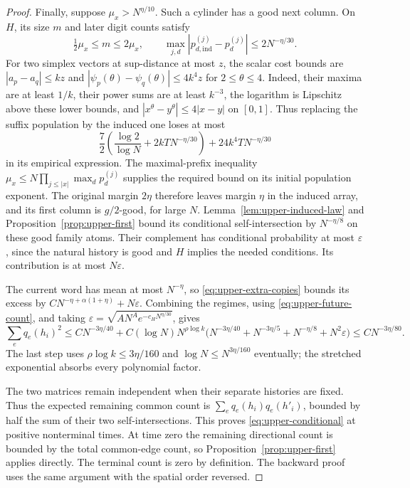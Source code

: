 \begin{proof}
Finally, suppose $\mu_x>N^{\eta/10}$. Such a cylinder has a good
next column. On $H$, its size $m$ and later digit counts satisfy
\[
 \tfrac12\mu_x\le m\le2\mu_x,\qquad
 \max_{j,d}|p_{d,\mathrm{ind}}^{(j)}-p_d^{(j)}|
                            \le2N^{-\eta/30}.
\]
For two simplex vectors at sup-distance at most $z$, the scalar
cost bounds are
$|a_p-a_q|\le kz$ and
$|\psi_p(\theta)-\psi_q(\theta)|\le4k^4z$ for $2\le\theta\le4$.
Indeed, their maxima are at least $1/k$, their power sums are at
least $k^{-3}$, the logarithm is Lipschitz above these lower bounds,
and $|x^\theta-y^\theta|\le4|x-y|$ on $[0,1]$.
Thus replacing the suffix population by the induced one loses at
most
\[
 \frac72\left(\frac{\log2}{\log N}+2kT N^{-\eta/30}\right)
                         +24k^4T N^{-\eta/30}
\]
in its empirical expression. The maximal-prefix inequality
$\mu_x\le N\prod_{j\le|x|}\max_d p_d^{(j)}$ supplies the required
bound on its initial population exponent. The original margin
$2\eta$ therefore leaves margin $\eta$ in the induced array, and
its first column is $g/2$-good, for large $N$.
Lemma~\ref{lem:upper-induced-law} and
Proposition~\ref{prop:upper-first} bound its conditional
self-intersection by $N^{-\eta/8}$ on these good family atoms.
Their complement has conditional probability at most $\varepsilon$,
since the natural history is good and $H$ implies the needed
conditions. Its contribution is at most $N\varepsilon$.

The current word has mean at most $N^{-\eta}$, so
\eqref{eq:upper-extra-copies} bounds its excess by
$CN^{-\eta+\alpha(1+\eta)}+N\varepsilon$.
Combining the regimes, using \eqref{eq:upper-future-count}, and
taking $\varepsilon=\sqrt{AN^A e^{-c_HN^{\eta/30}}}$, gives
\[
 \sum_e q_e(h_i)^2\le
 CN^{-3\eta/40}
 +C(\log N)N^{\rho\log k}
       \bigl(N^{-3\eta/40}+N^{-3\eta/5}+N^{-\eta/8}
                                      +N^2\varepsilon\bigr)
 \le CN^{-3\eta/80}.
\]
The last step uses $\rho\log k\le3\eta/160$ and
$\log N\le N^{3\eta/160}$ eventually; the stretched exponential
absorbs every polynomial factor.

The two matrices remain independent when their separate histories
are fixed. Thus the expected remaining common count is
$\sum_e q_e(h_i)q_e(h'_i)$, bounded by half the sum of their two
self-intersections. This proves \eqref{eq:upper-conditional} at
positive nonterminal times. At time zero the remaining directional
count is bounded by the total common-edge count, so
Proposition~\ref{prop:upper-first} applies directly. The terminal
count is zero by definition. The backward proof uses the same
argument with the spatial order reversed.
\end{proof}

